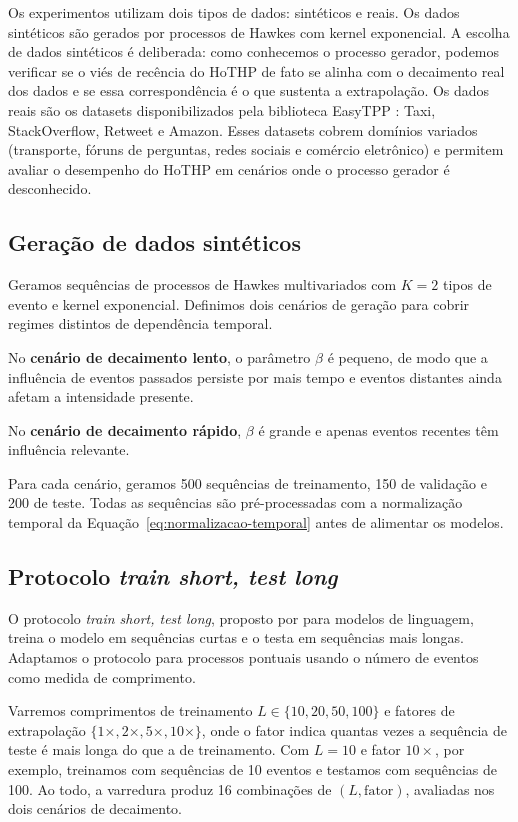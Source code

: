 Os experimentos utilizam dois tipos de dados: sintéticos e reais. Os dados sintéticos são gerados por processos de Hawkes com kernel exponencial. A escolha de dados sintéticos é deliberada: como conhecemos o processo gerador, podemos verificar se o viés de recência do HoTHP de fato se alinha com o decaimento real dos dados e se essa correspondência é o que sustenta a extrapolação. Os dados reais são os datasets disponibilizados pela biblioteca EasyTPP \cite{xue_easytpp_2024}: Taxi, StackOverflow, Retweet e Amazon. Esses datasets cobrem domínios variados (transporte, fóruns de perguntas, redes sociais e comércio eletrônico) e permitem avaliar o desempenho do HoTHP em cenários onde o processo gerador é desconhecido.

\subsection{Geração de dados sintéticos}
\label{subsec:geracao-dados}

Geramos sequências de processos de Hawkes multivariados com $K = 2$ tipos de evento e kernel exponencial. Definimos dois cenários de geração para cobrir regimes distintos de dependência temporal.

No \textbf{cenário de decaimento lento}, o parâmetro $\beta$ é pequeno, de modo que a influência de eventos passados persiste por mais tempo e eventos distantes ainda afetam a intensidade presente.

No \textbf{cenário de decaimento rápido}, $\beta$ é grande e apenas eventos recentes têm influência relevante.

Para cada cenário, geramos 500 sequências de treinamento, 150 de validação e 200 de teste. Todas as sequências são pré-processadas com a normalização temporal da Equação~\ref{eq:normalizacao-temporal} antes de alimentar os modelos.

\subsection{Protocolo \textit{train short, test long}}
\label{subsec:train-short-test-long}

O protocolo \textit{train short, test long}, proposto por  para modelos de linguagem, treina o modelo em sequências curtas e o testa em sequências mais longas. Adaptamos o protocolo para processos pontuais usando o número de eventos como medida de comprimento.

Varremos comprimentos de treinamento $L \in \{10, 20, 50, 100\}$ e fatores de extrapolação $\{1\times, 2\times, 5\times, 10\times\}$, onde o fator indica quantas vezes a sequência de teste é mais longa do que a de treinamento. Com $L = 10$ e fator $10\times$, por exemplo, treinamos com sequências de 10 eventos e testamos com sequências de 100. Ao todo, a varredura produz 16 combinações de $(L, \mathrm{fator})$, avaliadas nos dois cenários de decaimento.

